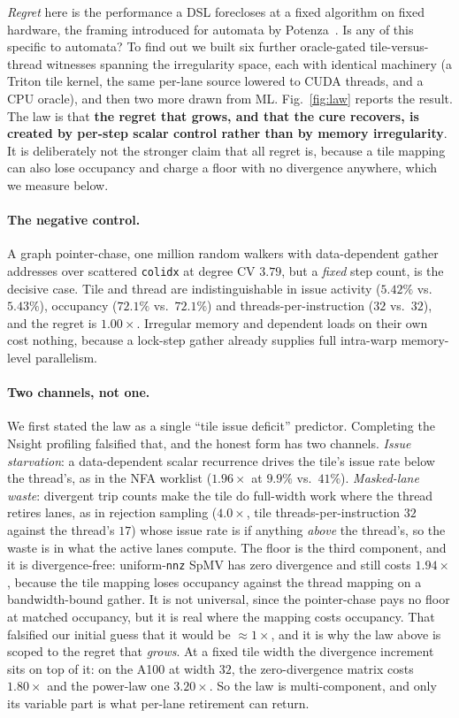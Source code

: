 \documentclass[sigplan,anonymous,review,nonacm,10pt]{acmart}
\begin{document}
\emph{Regret} here is the performance a DSL forecloses at a fixed algorithm on fixed
hardware, the framing introduced for automata by Potenza~\cite{twofaces2026}.
Is any of this specific to automata? To find out we built six further oracle-gated
tile-versus-thread witnesses spanning the irregularity space, each with identical machinery
(a Triton tile kernel, the same per-lane source lowered to CUDA threads, and a CPU oracle),
and then two more drawn from ML. Fig.~\ref{fig:law} reports the result. The law is that
\textbf{the regret that grows, and that the cure recovers, is created by per-step scalar
control rather than by memory irregularity}. It is deliberately not the stronger claim that
all regret is, because a tile mapping can also lose occupancy and charge a floor with no
divergence anywhere, which we measure below.

\paragraph{The negative control.} A graph pointer-chase, one million random walkers with
data-dependent gather addresses over scattered \texttt{colidx} at degree CV $3.79$, but a
\emph{fixed} step count, is the decisive case. Tile and thread are indistinguishable in
issue activity ($5.42\%$ vs.\ $5.43\%$), occupancy ($72.1\%$ vs.\ $72.1\%$) and
threads-per-instruction ($32$ vs.\ $32$), and the regret is $1.00\times$. Irregular memory
and dependent loads on their own cost nothing, because a lock-step gather already supplies
full intra-warp memory-level parallelism.

\paragraph{Two channels, not one.} We first stated the law as a single ``tile issue
deficit'' predictor. Completing the Nsight profiling falsified that, and the honest form has
two channels. \emph{Issue starvation}: a data-dependent scalar recurrence drives the tile's
issue rate below the thread's, as in the NFA worklist ($1.96\times$ at $9.9\%$ vs.\ $41\%$).
\emph{Masked-lane waste}: divergent trip counts make the tile do full-width work where the
thread retires lanes, as in rejection sampling ($4.0\times$, tile threads-per-instruction
$32$ against the thread's $17$) whose issue rate is if anything \emph{above} the thread's,
so the waste is in what the active lanes compute. The floor is the third component, and it is
divergence-free: uniform-\texttt{nnz} SpMV has zero divergence and still costs
$1.94\times$, because the tile mapping loses occupancy against the thread mapping on a
bandwidth-bound gather. It is not universal, since the pointer-chase pays no floor at
matched occupancy, but it is real where the mapping costs occupancy. That falsified our
initial guess that it would be ${\approx}1\times$, and it is why the law above is scoped
to the regret that \emph{grows}. At a fixed tile width the divergence increment sits on top
of it: on the A100 at width $32$, the zero-divergence matrix costs $1.80\times$ and the
power-law one $3.20\times$. So the law is multi-component, and only its variable part is
what per-lane retirement can return.
\end{document}
